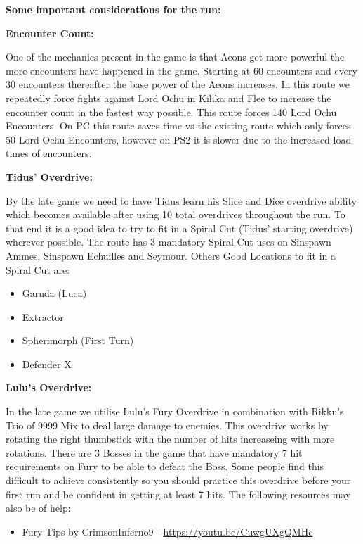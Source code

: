 \vspace{\baselineskip}

\textbf{\Large Some important considerations for the run:}

\vspace{\baselineskip}

\textbf{\large Encounter Count:}

One of the mechanics present in the game is that Aeons get more powerful the more encounters have happened in the game. Starting at 60 encounters and every 30 encounters thereafter the base power of the Aeons increases. In this route we repeatedly force fights against Lord Ochu in Kilika and Flee to increase the encounter count in the fastest way possible. This route forces 140 Lord Ochu Encounters. On PC this route saves time vs the existing route which only forces 50 Lord Ochu Encounters, however on PS2 it is slower due to the increased load times of encounters.

\vspace{\baselineskip}

\textbf{\large Tidus' Overdrive:}

\vspace{\baselineskip}

By the late game we need to have Tidus learn his Slice and Dice overdrive ability which becomes available after using 10 total overdrives throughout the run. To that end it is a good idea to try to fit in a Spiral Cut (Tidus' starting overdrive) wherever possible. The route has 3 mandatory Spiral Cut uses on Sinspawn Ammes, Sinspawn Echuilles and Seymour. Others Good Locations to fit in a Spiral Cut are:

\vspace{\baselineskip}

\begin{itemize}

	\item Garuda (Luca)
	\item Extractor
	\item Spherimorph (First Turn)
	\item Defender X

\end{itemize}

\vspace{\baselineskip}
	
\textbf{\large Lulu's Overdrive:}

\vspace{\baselineskip}

In the late game we utilise Lulu's Fury Overdrive in combination with Rikku's Trio of 9999 Mix to deal large damage to enemies. This overdrive works by rotating the right thumbstick with the number of hits increaseing with more rotations. There are 3 Bosses in the game that have mandatory 7 hit requirements on Fury to be able to defeat the Boss. Some people find this difficult to achieve consistently so you should practice this overdrive before your first run and be confident in getting at least 7 hits. The following resources may also be of help:

\vspace{\baselineskip}

\begin{itemize}

	\item Fury Tips by CrimsonInferno9 - \url{https://youtu.be/CuwgUXgQMHc}

\end{itemize}

\newpage